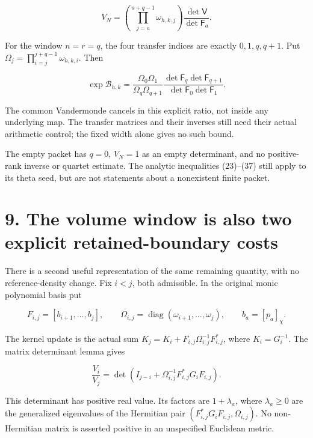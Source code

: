 \documentclass[
  11pt,
]{article}
\begin{document}
\[
 V_N=\left(\prod_{j=a}^{a+q-1}\omega_{h,k,j}\right)
                       \frac{\det\mathsf V}{\det\mathsf F_a}.           \tag{41}
\]

For the window \(n=r=q\), the four transfer indices are exactly
\(0,1,q,q+1\). Put \(\Omega_j=\prod_{i=j}^{j+q-1}\omega_{h,k,i}\). Then

\[
 \boxed{
 \exp\mathcal B_{h,k}
 =\frac{\Omega_0\Omega_1}{\Omega_q\Omega_{q+1}}
   \frac{\det\mathsf F_q\det\mathsf F_{q+1}}
        {\det\mathsf F_0\det\mathsf F_1}.
 }                                                                     \tag{42}
\]

The common Vandermonde cancels in this explicit ratio, not inside any
underlying map. The transfer matrices and their inverses still need
their actual arithmetic control; the fixed width alone gives no such
bound.

The empty packet has \(q=0\), \(V_N=1\) as an empty determinant, and no
positive-rank inverse or quartet estimate. The analytic inequalities
(23)--(37) still apply to its theta seed, but are not statements about a
nonexistent finite packet.

\section{9. The volume window is also two explicit retained-boundary
costs}\label{the-volume-window-is-also-two-explicit-retained-boundary-costs}

There is a second useful representation of the same remaining quantity,
with no reference-density change. Fix \(i<j\), both admissible. In the
original monic polynomial basis put

\[
 F_{i,j}=[b_{i+1},\ldots,b_j],\qquad
 \Omega_{i,j}=\operatorname{diag}(\omega_{i+1},\ldots,\omega_j),
 \qquad b_a=[p_a]_\chi.                                                 \tag{43}
\]

The kernel update is the actual sum
\(K_j=K_i+F_{i,j}\Omega_{i,j}^{-1}F_{i,j}^*\), where \(K_i=G_i^{-1}\).
The matrix determinant lemma gives

\[
 \boxed{\frac{V_i}{V_j}
 =\det\!\left(I_{j-i}+\Omega_{i,j}^{-1}F_{i,j}^*G_iF_{i,j}\right).}       \tag{44}
\]

This determinant has positive real value. Its factors are
\(1+\lambda_a\), where \(\lambda_a\ge0\) are the generalized eigenvalues
of the Hermitian pair \((F_{i,j}^*G_iF_{i,j},\Omega_{i,j})\). No
non-Hermitian matrix is asserted positive in an unspecified Euclidean
metric.
\end{document}
